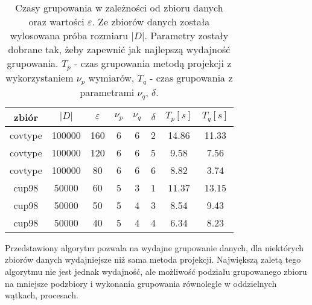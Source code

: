 \begin{table}[H]
	\centering
	\begin{tabular}{| c | c | c | c | c | c | c | c |}
		\hline
		zbiór     & $ |D| $ & $ \varepsilon $ & $ \nu_p $ & $ \nu_q $ & $ \delta $ & $ T_p [s]$ & $ T_q [s]$ \\ \hline
		covtype   & 100000  & 160 & 6 & 6 & 2 & 14.86 & 11.33  \\ \hline
		covtype   & 100000  & 120 & 6 & 6 & 5 & 9.58  & 7.56   \\ \hline
		covtype   & 100000  &  80 & 6 & 6 & 6 & 8.82  & 3.74   \\ \hline
		cup98     &  50000  &  60 & 5 & 3 & 1 & 11.37 & 13.15  \\ \hline
		cup98     &  50000  &  50 & 5 & 4 & 3 & 8.54  & 9.43    \\ \hline
		cup98     &  50000  &  40 & 5 & 4 & 4 & 6.34  & 8.23    \\ \hline
	\end{tabular}
	\caption{Czasy grupowania w zależności od zbioru danych oraz wartości $ \varepsilon $. Ze zbiorów danych została wylosowana próba rozmiaru $ |D| $. Parametry zostały dobrane tak, żeby zapewnić jak najlepszą wydajność grupowania. $ T_p $ - czas grupowania metodą projekcji z wykorzystaniem $ \nu_p $ wymiarów, $ T_q $ - czas grupowania  z parametrami $ \nu_q $, $ \delta $.}\label{table:projection-vs-qscan}
\end{table}
Przedstawiony algorytm pozwala na wydajne grupowanie danych, dla niektórych zbiorów danych wydajniejsze niż sama metoda projekcji. Największą zaletą tego algorytmu nie jest jednak wydajność, ale możliwość podziału grupowanego zbioru na mniejsze podzbiory i wykonania grupowania równolegle w oddzielnych wątkach, procesach.
